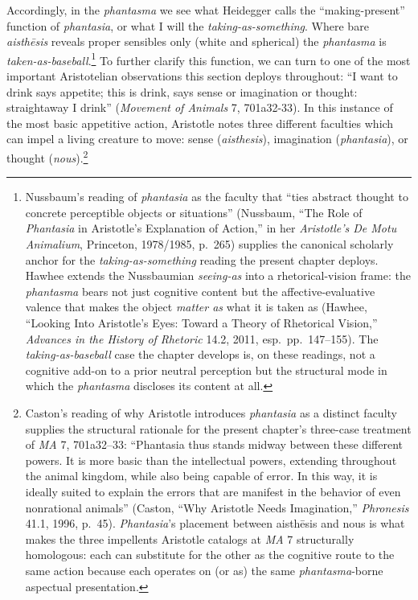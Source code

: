 \documentclass{article}
\begin{document}
Accordingly, in the \textit{phantasma} we see what Heidegger calls the ``making-present'' function of \textit{phantasia}, or what I will the \textit{taking-as-something}. Where bare \textit{aisthēsis} reveals proper sensibles only (white and spherical) the \textit{phantasma} is \textit{taken-as-baseball}.\footnote{Nussbaum's reading of \textit{phantasia} as the faculty that ``ties abstract thought to concrete perceptible objects or situations'' (Nussbaum, ``The Role of \textit{Phantasia} in Aristotle's Explanation of Action,'' in her \textit{Aristotle's De Motu Animalium}, Princeton, 1978/1985, p.~265) supplies the canonical scholarly anchor for the \textit{taking-as-something} reading the present chapter deploys. Hawhee extends the Nussbaumian \textit{seeing-as} into a rhetorical-vision frame: the \textit{phantasma} bears not just cognitive content but the affective-evaluative valence that makes the object \textit{matter as} what it is taken as (Hawhee, ``Looking Into Aristotle's Eyes: Toward a Theory of Rhetorical Vision,'' \textit{Advances in the History of Rhetoric} 14.2, 2011, esp.~pp.~147--155). The \textit{taking-as-baseball} case the chapter develops is, on these readings, not a cognitive add-on to a prior neutral perception but the structural mode in which the \textit{phantasma} discloses its content at all.} To further clarify this function, we can turn to one of the most important Aristotelian observations this section deploys throughout: ``I want to drink says appetite; this is drink, says sense or imagination or thought: straightaway I drink'' (\textit{Movement of Animals} 7, 701a32-33). In this instance of the most basic appetitive action, Aristotle notes three different faculties which can impel a living creature to move: sense (\textit{aisthesis}), imagination (\textit{phantasia}), or thought (\textit{nous}).\footnote{Caston's reading of why Aristotle introduces \textit{phantasia} as a distinct faculty supplies the structural rationale for the present chapter's three-case treatment of \textit{MA} 7, 701a32--33: ``Phantasia thus stands midway between these different powers. It is more basic than the intellectual powers, extending throughout the animal kingdom, while also being capable of error. In this way, it is ideally suited to explain the errors that are manifest in the behavior of even nonrational animals'' (Caston, ``Why Aristotle Needs Imagination,'' \textit{Phronesis} 41.1, 1996, p.~45). \textit{Phantasia}'s placement between aisthēsis and nous is what makes the three impellents Aristotle catalogs at \textit{MA} 7 structurally homologous: each can substitute for the other as the cognitive route to the same action because each operates on (or as) the same \textit{phantasma}-borne aspectual presentation.}
\end{document}
